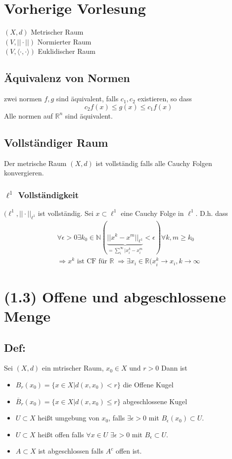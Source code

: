 \section{Vorherige Vorlesung} 
$(X,d)$ Metrischer Raum\\
$(V, ||\cdot||)$ Normierter Raum\\
$(V, \langle\cdot,\cdot\rangle)$ Euklidischer Raum\\

\subsection{Äquivalenz von Normen}
zwei normen $f, g$ sind äquivalent, falls $c_1,c_2$ existieren, so dass
$$
	c_2f(x) \leq g(x) \leq c_1f(x)
$$
Alle normen auf $\mathbb R^n$ sind äquivalent. 

\subsection{Vollständiger Raum}
Der metrische Raum $(X,d)$ ist vollständig falls alle Cauchy Folgen konvergieren.

\subsubsection{$\ell^1$ Vollständigkeit}
$(\ell^1, ||\cdot||_{\ell^1}$ ist vollständig. Sei $x\subset\ell^1$ eine Cauchy Folge in $\ell^1$. D.h. dass
\begin{gather}
	\forall \epsilon>0 \exists k_0\in\mathbb N (\underbrace{||x^k - x^m||_{\ell^1}}_{=\sum_i^\infty |x_i^k - x_i^m}<\epsilon)\forall k,m\geq k_0\\
\Rightarrow x^k \text{ ist CF für } \mathbb R\; \Rightarrow\exists x_i\in\mathbb R(x_i^k\rightarrow x_i, k\rightarrow\infty
\end{gather}

\section{(1.3) Offene und abgeschlossene Menge}
\subsection{Def: }
Sei $(X,d)$ ein mtrischer Raum, $x_0\in X$ und $r>0$ Dann ist
\begin{itemize}
	\item $B_r(x_0) = \{x\in X | d(x,x_0) < r\}$ die Offene Kugel
	\item $\overline B_r(x_0) = \{x\in X | d(x,x_0) \leq r\}$ abgeschlossene Kugel
	\item $U\subset X$ heißt umgebung von $x_0$, falls $\exists\epsilon>0$ mit $B_\epsilon(x_0)\subset U$.
	\item $U\subset X$ heißt offen falls $\forall x\in U$ $\exists \epsilon>0$ mit $B_\epsilon \subset U$.
	\item $A\subset X$ ist abgeschlossen falls $A^c$ offen ist.
\end{itemize}
